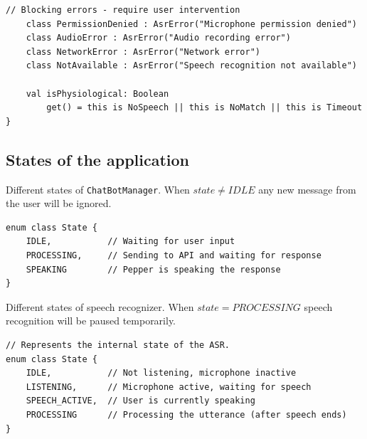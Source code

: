 \documentclass[a4paper]{article}
\begin{document}
\begin{appendices}
\begin{lstlisting}[style=kotlinstyle, caption={ASR error handling from HandsFreeAsr.kt}]
    // Blocking errors - require user intervention
    class PermissionDenied : AsrError("Microphone permission denied")
    class AudioError : AsrError("Audio recording error")
    class NetworkError : AsrError("Network error")
    class NotAvailable : AsrError("Speech recognition not available")

    val isPhysiological: Boolean
        get() = this is NoSpeech || this is NoMatch || this is Timeout
}
\end{lstlisting}

\subsection{States of the application}
\label{app:states}
Different states of \texttt{ChatBotManager}. When $state \neq IDLE$ any new message from the user will be ignored.
\begin{lstlisting}[style=kotlinstyle, caption={enum State from ChatBotManager.kt}, label=lst:chatbot-states]
enum class State {
    IDLE,           // Waiting for user input
    PROCESSING,     // Sending to API and waiting for response
    SPEAKING        // Pepper is speaking the response
}
\end{lstlisting}

Different states of speech recognizer. When $state = PROCESSING$ speech recognition will be paused temporarily.
\begin{lstlisting}[style=kotlinstyle, caption={enum State from HandsFreeAsr.kt}, label=lst:asr-states]
// Represents the internal state of the ASR.
enum class State {
    IDLE,           // Not listening, microphone inactive
    LISTENING,      // Microphone active, waiting for speech
    SPEECH_ACTIVE,  // User is currently speaking
    PROCESSING      // Processing the utterance (after speech ends)
}
\end{lstlisting}


\end{appendices}
\end{document}
